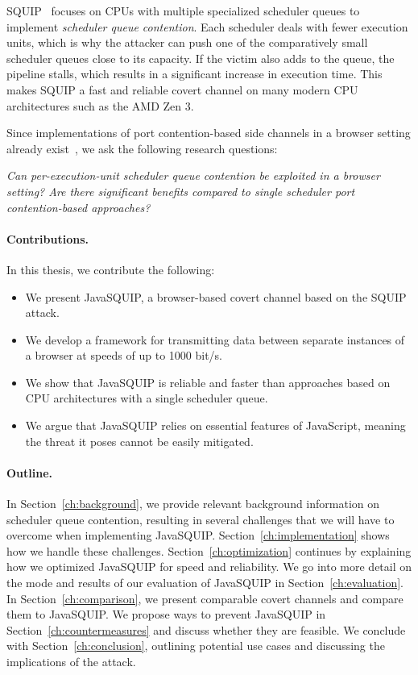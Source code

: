 \documentclass[11pt,
  titlepage=false,
  parskip=half,      %
]{scrreprt}
\begin{document}
SQUIP~\cite{squip} focuses on CPUs with multiple specialized scheduler queues to implement \textit{scheduler queue contention}.
Each scheduler deals with fewer execution units, which is why the attacker can push one of the comparatively small scheduler queues close to its capacity.
If the victim also adds to the queue, the pipeline stalls, which results in a significant increase in execution time.
This makes SQUIP a fast and reliable covert channel on many modern CPU architectures such as the AMD Zen 3.~\cite{squip}

Since implementations of port contention-based side channels in a browser setting already exist~\cite{Rokicki2022webport}, we ask the following research questions:

\textit{
    Can per-execution-unit scheduler queue contention be exploited in a browser setting?
    Are there significant benefits compared to single scheduler port contention-based approaches?
}

\pagebreak
\paragraph{Contributions.}
In this thesis, we contribute the following:
\begin{itemize}
    \item We present JavaSQUIP, a browser-based covert channel based on the SQUIP~\cite{squip} attack.
    \item We develop a framework for transmitting data between separate instances of a browser at speeds of up to 1000 bit/s.
    \item We show that JavaSQUIP is reliable and faster than approaches based on CPU architectures with a single scheduler queue.
    \item We argue that JavaSQUIP relies on essential features of JavaScript, meaning the threat it poses cannot be easily mitigated.
\end{itemize}

\paragraph{Outline.}
In Section~\ref{ch:background}, we provide relevant background information on scheduler queue contention,
resulting in several challenges that we will have to overcome when implementing JavaSQUIP.
Section~\ref{ch:implementation} shows how we handle these challenges.
Section~\ref{ch:optimization} continues by explaining how we optimized JavaSQUIP for speed and reliability.
We go into more detail on the mode and results of our evaluation of JavaSQUIP in Section~\ref{ch:evaluation}.
In Section~\ref{ch:comparison}, we present comparable covert channels and compare them to JavaSQUIP.
We propose ways to prevent JavaSQUIP in Section~\ref{ch:countermeasures} and discuss whether they are feasible.
We conclude with Section~\ref{ch:conclusion}, outlining potential use cases and discussing the implications of the attack.
\end{document}
